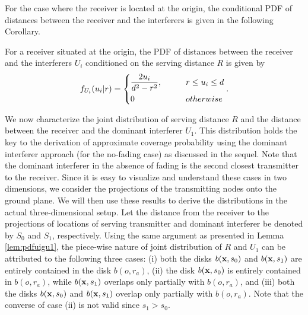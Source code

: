 \documentclass[journal,draftclsnofoot,onecolumn,12pt]{IEEEtran}
\begin{document}
For the case where the receiver is located at the origin, the conditional PDF of distances between the receiver and the interferers is given in the following Corollary.
\begin{cor}
For a receiver situated at the origin, the PDF of distances between the receiver and the interferers $U_i$ conditioned on the serving distance $R$ is given by
\begin{align}
f_{U_i}(u_i | r) =\begin{dcases}
\frac{2u_i}{d^2 - r^2}, \qquad &r \leq u_i \leq d \\
0 \qquad &otherwise
\end{dcases}.
\end{align}
\end{cor}
We now characterize the joint distribution of serving distance $R$ and the distance between the receiver and the dominant interferer $U_1$. This distribution holds the key to the derivation of approximate coverage probability using the dominant interferer approach (for the no-fading case) as discussed in the sequel. Note that the dominant interferer in the absence of fading is the second closest transmitter to the receiver.
Since it is easy to visualize and understand these cases in two dimensions, we consider the projections of the transmitting nodes onto the ground plane. We will then use these results to derive the distributions in the actual three-dimensional setup. 
Let the distance from the receiver to the projections of locations of serving transmitter and dominant interferer be denoted by $S_0$ and $S_1$, respectively. Using the same argument as presented in Lemma \ref{lem:pdfuigu1}, the piece-wise nature of joint distribution of $R$ and $U_1$ can be attributed to the following three cases: (i) both the disks $b({\bf{x}},s_0)$ and $b({\bf{x}},s_1)$ are entirely contained in the disk $b(o,r_a)$, (ii) the disk $b({\bf{x}},s_0)$ is entirely contained in $b(o,r_a)$, while $b({\bf{x}},s_1)$ overlaps only partially with $b(o,r_a)$, and (iii) both the disks $b({\bf{x}},s_0)$ and $b({\bf{x}},s_1)$ overlap only partially with $b(o,r_a)$. Note that the converse of case (ii) is not valid since $s_1 > s_0$.
\end{document}
